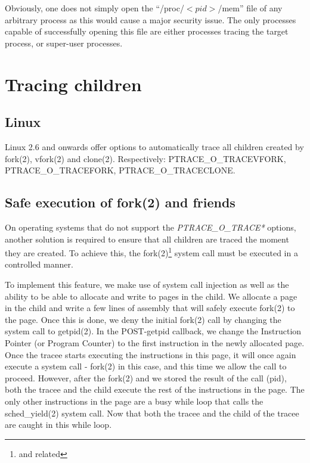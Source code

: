 \documentclass[a4paper, twoside, 10pt, twocolumn]{report}
\begin{document}
Obviously, one does not simply open the ``/proc/$<pid>$/mem'' file of any
arbitrary process as this would cause a major security issue. The only
processes capable of successfully opening this file are either processes
tracing the target process, or super-user processes.


\section{Tracing children}

\subsection{Linux}

Linux 2.6 and onwards offer options to automatically trace all children
created by fork(2), vfork(2) and clone(2). Respectively:
PTRACE\_O\_TRACEVFORK, PTRACE\_O\_TRACEFORK, PTRACE\_O\_TRACECLONE.


\subsection{Safe execution of fork(2) and friends}

On operating systems that do not support the \textit{PTRACE\_O\_TRACE*} options,
another solution is required to ensure that all children are traced the moment
they are created. To achieve this, the fork(2)\footnote{and related} system call
must be executed in a controlled manner.

To implement this feature, we make use of system call injection as well as the
ability to be able to allocate and write to pages in the child. We allocate a
page in the child and write a few lines of assembly that will safely execute
fork(2) to the page. Once this is done, we deny the initial fork(2) call by
changing the system call to getpid(2). In the POST-getpid callback, we change
the Instruction Pointer (or Program Counter) to the first instruction in the
newly allocated page. Once the tracee starts executing the instructions in this
page, it will once again execute a system call - fork(2) in this case, and this
time we allow the call to proceed. However, after the fork(2) and we stored the
result of the call (pid), both the tracee and the child execute the rest of the
instructions in the page. The only other instructions in the page are a busy
while loop that calls the sched\_yield(2) system call. Now that both the tracee
and the child of the tracee are caught in this while loop.
\end{document}
